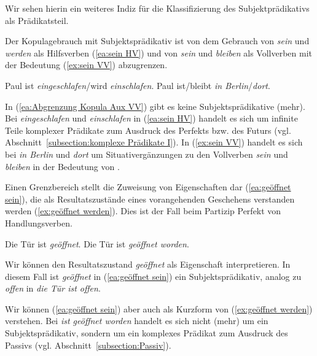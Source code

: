 \ea \label{ea:SP Subjektwahl}
\label{ea:Erfolg sein}
\label{ex:Brief sein} 
\z 
\z 

Wir sehen hierin ein weiteres Indiz für die Klassifizierung des Subjektprädikativs als Prädikatsteil.  

Der Kopulagebrauch mit Subjektsprädikativ ist von dem Gebrauch von \textit{sein} und \textit{werden} als Hilfsverben (\ref{ea:sein HV}) und von \textit{sein} und \textit{bleiben} als Vollverben mit der Bedeutung  (\ref{ex:sein VV}) abzugrenzen. 

\ea \label{ea:Abgrenzung Kopula Aux VV}
\ea \label{ea:sein HV} Paul ist \textit{eingeschlafen}/wird \textit{einschlafen}.
\ex\label{ex:sein VV} Paul ist/bleibt \textit{in Berlin}/\textit{dort}.
\z 
\z 

In (\ref{ea:Abgrenzung Kopula Aux VV}) gibt es keine Subjektsprädikative (mehr). Bei \textit{eingeschlafen} und \textit{einschlafen} in (\ref{ea:sein HV}) handelt es sich um infinite Teile komplexer Prädikate zum Ausdruck des Perfekts bzw. des Futurs (vgl. Abschnitt~\ref{subsection:komplexe Prädikate I}). In (\ref{ex:sein VV}) handelt es sich bei \textit{in Berlin} und \textit{dort} um Situativergänzungen zu den Vollverben \textit{sein} und \textit{bleiben} in der Bedeutung von . 

Einen Grenzbereich stellt die Zuweisung von Eigenschaften dar (\ref{ea:geöffnet sein}), die als Resultatszustände eines vorangehenden Geschehens verstanden werden (\ref{ex:geöffnet werden}). Dies ist der Fall beim Partizip Perfekt \ua von Handlungsverben. 

\ea \label{ea:Resultatszustand}
\ea \label{ea:geöffnet sein} Die Tür ist \textit{geöffnet}.
\ex \label{ex:geöffnet werden} Die Tür ist \textit{geöffnet worden}.
\z 
\z 

Wir können den Resultatszustand \textit{geöffnet} als Eigenschaft interpretieren. In diesem Fall ist \textit{geöffnet} in (\ref{ea:geöffnet sein}) ein Subjektsprädikativ, analog zu \textit{offen} in \textit{die Tür ist offen}.

Wir können (\ref{ea:geöffnet sein}) aber auch als Kurzform von (\ref{ex:geöffnet werden}) verstehen. Bei \textit{ist geöffnet worden} handelt es sich nicht (mehr) um ein Subjektsprädikativ, sondern um ein komplexes Prädikat zum Ausdruck des Passivs (vgl. Abschnitt~\ref{subsection:Passiv}).  


